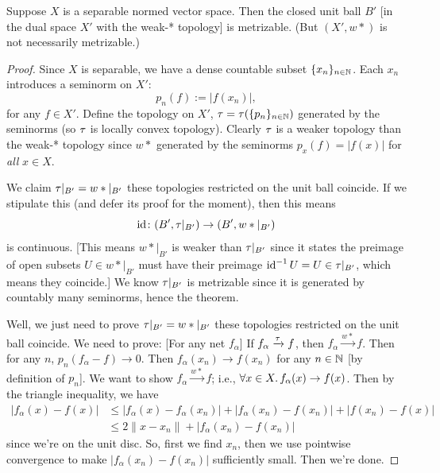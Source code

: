 \begin{theorem}
Suppose $X$ is a separable normed vector space.
Then the closed unit ball $B'$ [in the dual space $X'$ with the weak-* topology]
is metrizable. (But $(X',w*)$ is not necessarily metrizable.)
\end{theorem}

\begin{proof}
Since $X$ is separable, we have a dense countable subset $\{x_{n}\}_{n\in\mathbb{N}}$.
Each $x_{n}$ introduces a seminorm on $X'$:
\begin{equation}
p_{n}(f):=|f(x_{n})|,
\end{equation}
for any $f\in X'$. Define the topology on $X'$, $\tau=\tau(\{p_{n}\}_{n\in\mathbb{N}})$
generated by the seminorms (so $\tau$ is locally convex
topology). Clearly $\tau$ is a weaker topology than the weak-*
topology since $w*$ generated by the seminorms $p_{x}(f)=|f(x)|$ for
\emph{all} $x\in X$.

We claim $\tau|_{B'}=w*|_{B'}$ these topologies restricted on the
unit ball coincide. If we stipulate this (and defer its proof for the
moment), then this means
\begin{equation}
\operatorname{id}\colon(B',\tau|_{B'})\to(B',w*|_{B'})
\end{equation}
is continuous. [This means $w*|_{B'}$ is weaker than $\tau|_{B'}$
  since it states the preimage of open subsets $U\in w*|_{B'}$ must
  have their preimage $\operatorname{id}^{-1}U=U\in\tau|_{B'}$,
  which means they coincide.]
We know $\tau|_{B'}$ is metrizable since it is generated by
countably many seminorms, hence the theorem.

Well, we just need to prove $\tau|_{B'}=w*|_{B'}$ these topologies restricted on the
unit ball coincide. We need to prove: [For any net $f_{\alpha}$] If $f_{\alpha}\xrightarrow{\tau}f$, then $f_{\alpha}\xrightarrow{w*}f$.
Then for any $n$, $p_{n}(f_{\alpha}-f)\to0$. Then
$f_{\alpha}(x_{n})\to f(x_{n})$ for any $n\in\mathbb{N}$ [by definition of $p_{n}$].
We want to show $f_{\alpha}\xrightarrow{w*}f$; i.e., $\forall x\in X\ldotp f_{\alpha}(x)\to f(x)$.
Then by the triangle inequality, we have
\begin{subequations}
  \begin{align}
|f_{\alpha}(x)-f(x)| &\leq |f_{\alpha}(x)-f_{\alpha}(x_{n})|+|f_{\alpha}(x_{n})-f(x_{n})|+|f(x_{n})-f(x)|\\
&\leq2\|x-x_{n}\|+|f_{\alpha}(x_{n})-f(x_{n})|
  \end{align}
\end{subequations}
since we're on the unit disc. So, first we find $x_{n}$, then we use
pointwise convergence to make $|f_{\alpha}(x_{n})-f(x_{n})|$
sufficiently small. Then we're done.
\end{proof}